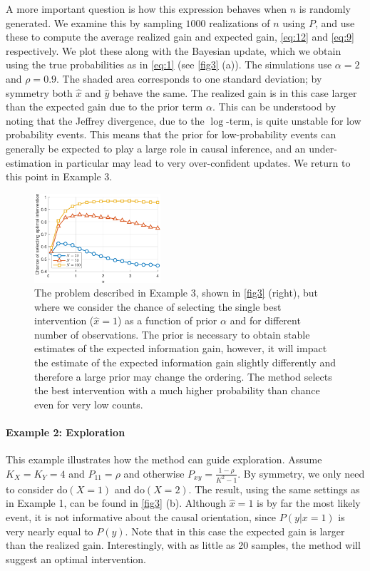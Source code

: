\documentclass[letterpaper]{article} %
\newcommand{\doo}{\textrm{do}}
\begin{document}
A more important question is how this expression behaves when $n$ is randomly generated. We examine this by sampling $1000$ realizations of $n$ using $P$, and use these to compute the average realized gain and expected gain, \cref{eq:12} and \cref{eq:9} respectively.  We plot these along with the Bayesian update, which we obtain using the true probabilities as in \cref{eq:1} (see \cref{fig3} (a)). The simulations use $\alpha = 2$ and $\rho = 0.9$. The shaded area corresponds to one standard deviation; by symmetry both $\hat x$ and $\hat y$ behave the same. The realized gain is in this case larger than the expected gain due to the prior term $\alpha$. This can be understood by noting that the Jeffrey divergence, due to the $\log$-term, is quite unstable for low probability events. This means that the prior for low-probability events can generally be expected to play a large role in causal inference, and an under-estimation in particular may lead to very over-confident updates. We return to this point in Example 3.

\begin{figure}[t!]
\centering
\includegraphics[width=.8\linewidth,height=1.3in ]{alpha-crop}
\caption{The problem described in Example 3, shown in \cref{fig3} (right), but where we consider the chance of selecting the single best intervention ($\hat x=1$) as a function of prior $\alpha$ and for different number of observations. The prior is necessary to obtain stable estimates of the expected information gain, however, it will impact the estimate of the expected information gain slightly differently and therefore a large prior may change the ordering. The method selects the best intervention with a much higher probability than chance even for very low counts. }\label{fig4}
\end{figure}




\paragraph{Example 2: Exploration}
This example illustrates how the method can guide exploration. Assume $K_X = K_Y = 4$ and $P_{11} = \rho$ and otherwise $P_{xy} = \frac{1-\rho}{ K^2-1}$. By symmetry, we only need to consider $\doo(X=1)$ and $\doo(X=2)$. The result, using the same settings as in Example 1, can be found in \cref{fig3} (b). Although $\hat x =1$ is by far the most likely event, it is not informative about the causal orientation, since $P(y|x=1)$ is very nearly equal to $P(y)$. Note that in this case the expected gain is larger than the realized gain. Interestingly, with as little as 20 samples, the method will suggest an optimal intervention.
\end{document}
